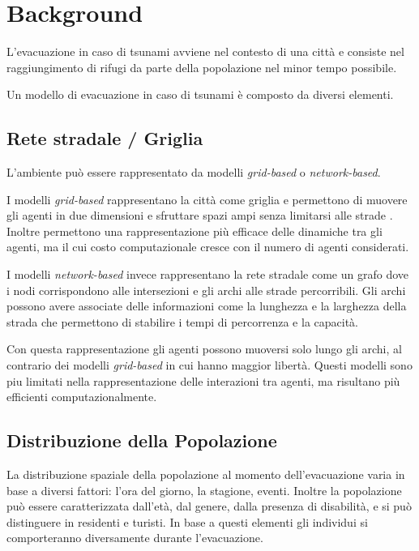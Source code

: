 \section{Background}
\label{sec:background}
L'evacuazione in caso di tsunami avviene nel contesto di una città e 
consiste nel raggiungimento di rifugi da parte della popolazione nel minor tempo possibile.

Un modello di evacuazione in caso di tsunami è composto da diversi elementi.

\subsection{Rete stradale / Griglia}
L'ambiente può essere rappresentato da modelli \textit{grid-based} o \textit{network-based}.

I modelli \textit{grid-based} rappresentano la città come griglia e permettono di muovere gli agenti in due dimensioni 
e sfruttare spazi ampi senza limitarsi alle strade \parencite{makinoshima2018enhancing}.
Inoltre permettono una rappresentazione più efficace delle dinamiche tra gli agenti, ma il cui costo computazionale 
cresce con il numero di agenti considerati.

I modelli \textit{network-based} invece rappresentano la rete stradale come un grafo dove i nodi corrispondono alle intersezioni e gli archi alle strade percorribili.
Gli archi possono avere associate delle informazioni come la lunghezza e la larghezza della strada che permettono di stabilire i tempi di percorrenza e la capacità.

Con questa rappresentazione gli agenti possono muoversi solo lungo gli archi, al contrario dei modelli \textit{grid-based} in cui hanno maggior libertà.
Questi modelli sono piu limitati nella rappresentazione delle interazioni tra agenti, ma risultano più efficienti computazionalmente.

\subsection{Distribuzione della Popolazione}
La distribuzione spaziale della popolazione al momento dell'evacuazione varia in base a diversi fattori:
l'ora del giorno, la stagione, eventi. 
Inoltre la popolazione può essere caratterizzata dall'età, dal genere, dalla presenza di disabilità, 
e si può distinguere in residenti e turisti.
%
In base a questi elementi gli individui si comporteranno diversamente durante l'evacuazione.

